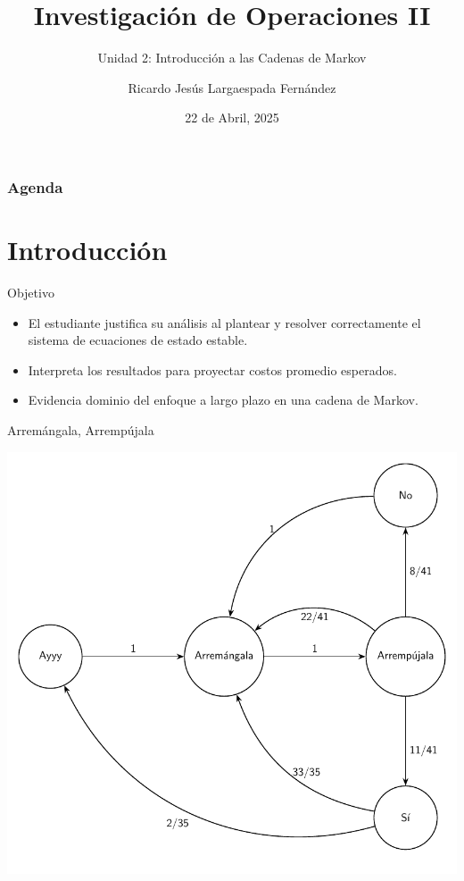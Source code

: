 \documentclass{beamer}
\title{Investigación de Operaciones II}
\subtitle{Unidad 2: Introducción a las Cadenas de Markov}
\author[Ricardo Largaespada]{Ricardo Jesús Largaespada Fernández}
\institute[UNI]{Ingeniería de Sistemas, DACTIC, UNI}
\date{22 de Abril, 2025}
\begin{document}
\frame{\titlepage}

\begin{frame}
\frametitle{Agenda}
\tableofcontents
\end{frame}

\section{Introducción}

\begin{frame}{Objetivo}
\begin{itemize}
  \item El estudiante justifica su análisis al plantear y resolver correctamente el sistema de ecuaciones de estado estable.
  \item Interpreta los resultados para proyectar costos promedio esperados.
  \item Evidencia dominio del enfoque a largo plazo en una cadena de Markov.
\end{itemize}
\end{frame}

\begin{frame}{Arremángala, Arrempújala}
    \begin{center}
        \includegraphics[scale=0.5]{images/clase13-KarkisMarkov.pdf} 
    \end{center}
\end{frame}
\end{document}
